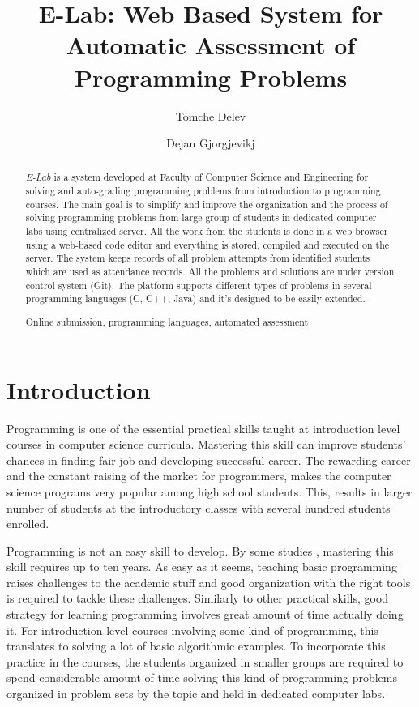 \documentclass{llncs}
\newcommand{\keywords}[1]{\par\addvspace\baselineskip
\noindent\keywordname\enspace\ignorespaces#1}
\begin{document}
\title{E-Lab: Web Based System for Automatic Assessment of
Programming Problems}

\author{Tomche Delev \and Dejan Gjorgjevikj}



\maketitle


\begin{abstract}
\emph{E-Lab} is a system developed at Faculty of Computer Science and
Engineering for solving and auto-grading programming problems from introduction
to programming courses. The main goal is to simplify and improve the
organization and the process of solving programming problems from large group of
students in dedicated computer labs using centralized server. All the work from
the students is done in a web browser using a web-based code editor and
everything is stored, compiled and executed on the server. The system 
keeps records of all problem attempts from identified students which are used as
attendance records. All the problems and solutions are under version control
system (Git). The platform supports different types of problems in several
programming languages (C, C++, Java) and it's designed to be easily extended.

\keywords{Online submission, programming languages, automated assessment}
\end{abstract}

\section{Introduction}
Programming is one of the essential practical skills taught at introduction
level courses in computer science curricula. Mastering this skill can improve
students' chances in finding fair job and developing successful career. The
rewarding career and the constant raising of the market for programmers, makes
the computer science programs very popular among high school students. This,
results in larger number of students at the introductory classes with several
hundred students enrolled.

Programming is not an easy skill to develop. By some studies \cite{winslow1996programming}, mastering this
skill requires up to ten years. As easy as it seems, teaching basic programming
raises challenges to the academic stuff and good organization with the right
tools is required to tackle these challenges. Similarly to other practical
skills, good strategy for learning programming involves great amount of time
actually doing it. For introduction level courses involving some kind of
programming, this translates to solving a lot of basic algorithmic examples. To
incorporate this practice in the courses, the students organized in smaller
groups are required to spend considerable amount of time solving this kind of
programming problems organized in problem sets by the topic and held in
dedicated computer labs.
\end{document}
